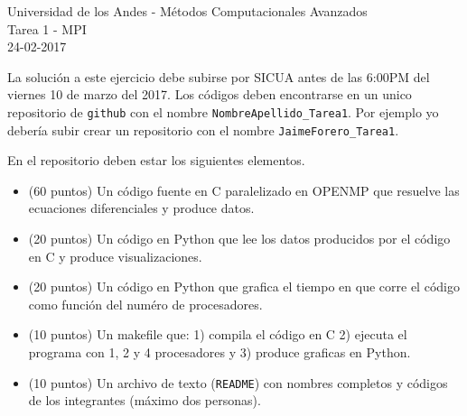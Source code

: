 \documentclass[11pt,letterpaper]{exam}
\begin{document}
\begin{center}
{\Large Universidad de los Andes - M\'etodos Computacionales Avanzados} \\
Tarea 1 - \textsc{MPI}\\
24-02-2017\\
\end{center}

\vspace{0.3cm}


\noindent
La soluci\'on a este ejercicio debe subirse por SICUA antes de las 6:00PM
del viernes 10 de marzo del 2017. 
Los c\'odigos deben encontrarse en un unico repositorio de \verb'github'
con el nombre \verb"NombreApellido_Tarea1". Por ejemplo yo deber\'ia
subir crear un repositorio con el nombre \verb"JaimeForero_Tarea1". 

\noindent
En el repositorio deben estar los siguientes elementos.
\begin{itemize}
\item (60 puntos) Un c\'odigo fuente en C paralelizado en OPENMP que resuelve las ecuaciones diferenciales y produce datos.
\item (20 puntos) Un c\'odigo en Python que lee los datos producidos por el
  c\'odigo en C y produce visualizaciones.
\item (20 puntos) Un c\'odigo en Python que grafica el tiempo en que corre el c\'odigo como funci\'on del num\'ero de procesadores.
\item (10 puntos) Un makefile que: 1) compila el c\'odigo en C 2) ejecuta el programa con 1, 2 y 4 procesadores y 3) produce graficas en Python.
\item (10 puntos) Un archivo de texto (\verb"README") con nombres completos y c\'odigos de los integrantes (m\'aximo dos personas).
\end{itemize}

\vspace{0.3cm}
\end{document}
